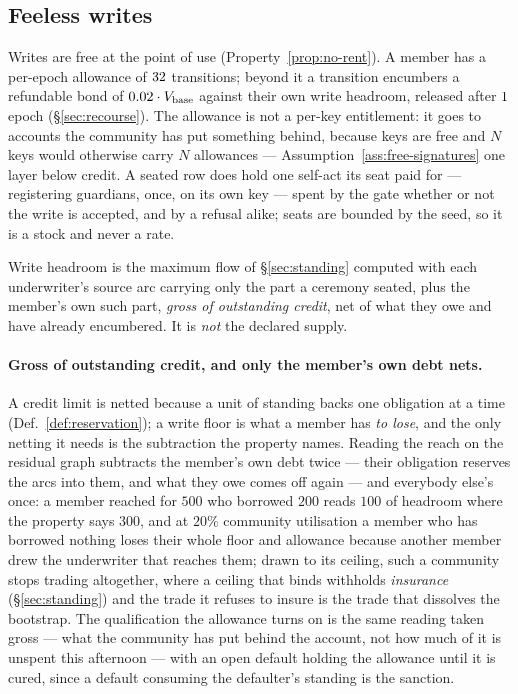 \subsection{Feeless writes}

Writes are free at the point of use (Property~\ref{prop:no-rent}). A member has a
per-epoch allowance of $32$ transitions; beyond it a transition
encumbers a refundable bond of $0.02 \cdot V_{\mathrm{base}}$ against their own
write headroom, released after $1$ epoch
(\S\ref{sec:recourse}). The allowance is not a per-key entitlement: it goes to accounts
the community has put something behind, because keys are free and $N$ keys would
otherwise carry $N$ allowances --- Assumption~\ref{ass:free-signatures} one layer below
credit. A seated row does hold one self-act its seat paid for --- registering guardians,
once, on its own key --- spent by the gate whether or not the write is accepted, and by a
refusal alike; seats are bounded by the seed, so it is a stock and never a rate.

\begin{property}
\label{prop:write-floor}
Write headroom is the maximum flow of \S\ref{sec:standing} computed with each
underwriter's source arc carrying only the part a ceremony seated, plus the member's own
such part, \emph{gross of outstanding credit}, net of what they owe and have already
encumbered. It is \emph{not} the declared supply.
\end{property}

\paragraph{Gross of outstanding credit, and only the member's own debt nets.} A credit
limit is netted because a unit of standing backs one obligation at a time
(Def.~\ref{def:reservation}); a write floor is what a member has \emph{to lose}, and the
only netting it needs is the subtraction the property names. Reading the reach on the
residual graph subtracts the member's own debt twice --- their obligation reserves the
arcs into them, and what they owe comes off again --- and everybody else's once: a member
reached for $500$ who borrowed $200$ reads $100$ of headroom where the property says
$300$, and at $20\%$ community utilisation a member who has borrowed nothing loses their
whole floor and allowance because another member drew the underwriter that reaches them;
drawn to its ceiling, such a community stops trading altogether, where a ceiling that
binds withholds \emph{insurance} (\S\ref{sec:standing}) and the trade it refuses to insure
is the trade that dissolves the bootstrap. The qualification the allowance turns on is the
same reading taken gross --- what the community has put behind the account, not how much
of it is unspent this afternoon --- with an open default holding the allowance until it is
cured, since a default consuming the defaulter's standing is the sanction.

